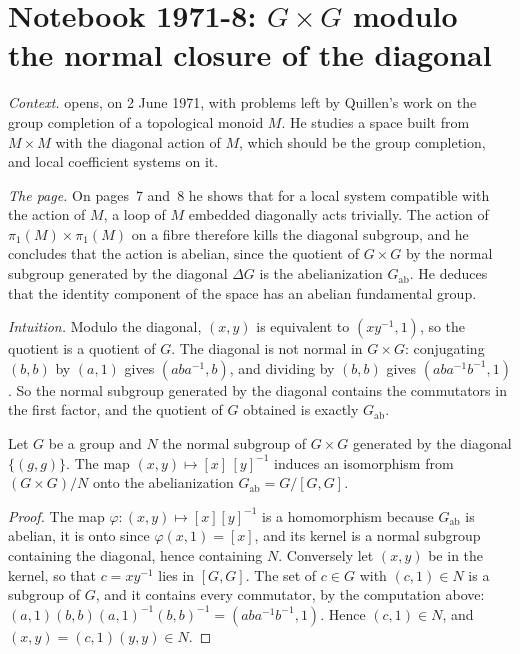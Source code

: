 \section[Notebook 1971-8: $G \times G$ modulo the diagonal]{Notebook 1971-8: $G \times G$ modulo the normal closure of the diagonal\protect{}}\label{sec:quillen-1971-8}

\emph{Context.}  opens, on 2 June 1971, with problems left by Quillen's work on the group completion of a topological monoid $M$. He studies a space built from $M \times M$ with the diagonal action of $M$, which should be the group completion, and local coefficient systems on it.

\emph{The page.} On pages~7 and~8 he shows that for a local system compatible with the action of $M$, a loop of $M$ embedded diagonally acts trivially. The action of $\pi_1(M) \times \pi_1(M)$ on a fibre therefore kills the diagonal subgroup, and he concludes that the action is abelian, since the quotient of $G \times G$ by the normal subgroup generated by the diagonal $\Delta G$ is the abelianization $G_{\mathrm{ab}}$. He deduces that the identity component of the space has an abelian fundamental group.

\emph{Intuition.} Modulo the diagonal, $(x, y)$ is equivalent to $(xy^{-1}, 1)$, so the quotient is a quotient of $G$. The diagonal is not normal in $G \times G$: conjugating $(b, b)$ by $(a, 1)$ gives $(aba^{-1}, b)$, and dividing by $(b, b)$ gives $(aba^{-1}b^{-1}, 1)$. So the normal subgroup generated by the diagonal contains the commutators in the first factor, and the quotient of $G$ obtained is exactly $G_{\mathrm{ab}}$.

\begin{encadre}
\begin{theoreme}\label{thm:quillen-1971-8}
Let $G$ be a group and $N$ the normal subgroup of $G \times G$ generated by the diagonal $\{(g, g)\}$. The map $(x, y) \mapsto [x]\,[y]^{-1}$ induces an isomorphism from $(G \times G)/N$ onto the abelianization $G_{\mathrm{ab}} = G/[G, G]$.
\end{theoreme}
\end{encadre}

\begin{proof}
The map $\varphi : (x, y) \mapsto [x][y]^{-1}$ is a homomorphism because $G_{\mathrm{ab}}$ is abelian, it is onto since $\varphi(x, 1) = [x]$, and its kernel is a normal subgroup containing the diagonal, hence containing $N$. Conversely let $(x, y)$ be in the kernel, so that $c = xy^{-1}$ lies in $[G, G]$. The set of $c \in G$ with $(c, 1) \in N$ is a subgroup of $G$, and it contains every commutator, by the computation above: $(a, 1)(b, b)(a, 1)^{-1}(b, b)^{-1} = (aba^{-1}b^{-1}, 1)$. Hence $(c, 1) \in N$, and $(x, y) = (c, 1)(y, y) \in N$.
\end{proof}

